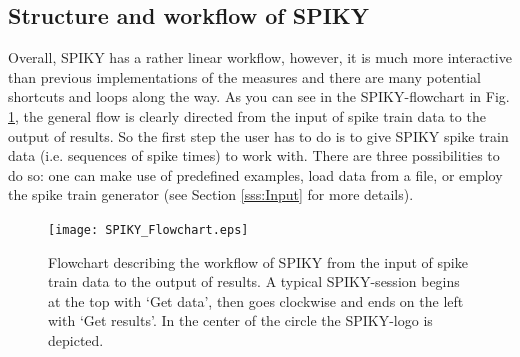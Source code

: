 \documentclass[10pt,twocolumn]{elsart5p}
\begin{document}
\subsection{\label{ss:Structure} Structure and workflow of SPIKY}

Overall, SPIKY has a rather linear workflow, however, it is much more interactive than previous implementations of the measures and there are many potential shortcuts and loops along the way. As you can see in the SPIKY-flowchart in Fig. \ref{fig:SPIKY-Flowchart}, the general flow is clearly directed from the input of spike train data to the output of results. So the first step the user has to do is to give SPIKY spike train data (i.e. sequences of spike times) to work with. There are three possibilities to do so: one can make use of predefined examples, load data from a file, or employ the spike train generator (see Section \ref{sss:Input} for more details).
%
%
\begin{figure}
    \texttt{[image: SPIKY\_Flowchart.eps]}
    \caption{\abb\label{fig:SPIKY-Flowchart} Flowchart describing the workflow of SPIKY from 	the input of spike train data to the output of results. A typical SPIKY-session begins at the top with `Get data', then goes clockwise and ends on the left with `Get results'. In the center of the circle the SPIKY-logo is depicted.}
\end{figure}
%
\end{document}
